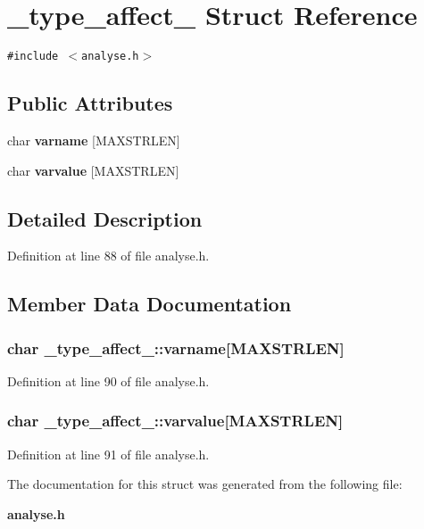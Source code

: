 \section{\_\-type\_\-affect\_\- Struct Reference}
\label{struct__type__affect__}
{\tt \#include $<$analyse.h$>$}

\subsection*{Public Attributes}
\begin{CompactItemize}
\item 
char {\bf varname} [MAXSTRLEN]
\item 
char {\bf varvalue} [MAXSTRLEN]
\end{CompactItemize}


\subsection{Detailed Description}


Definition at line 88 of file analyse.h.

\subsection{Member Data Documentation}
\subsubsection[{varname}]{\setlength{\rightskip}{0pt plus 5cm}char {\bf \_\-type\_\-affect\_\-::varname}[MAXSTRLEN]}\label{struct__type__affect___1edec9e19577f677c93b01add5342530}




Definition at line 90 of file analyse.h.
\subsubsection[{varvalue}]{\setlength{\rightskip}{0pt plus 5cm}char {\bf \_\-type\_\-affect\_\-::varvalue}[MAXSTRLEN]}\label{struct__type__affect___c29b2106e4535a40d6008dfefc4ccce3}




Definition at line 91 of file analyse.h.

The documentation for this struct was generated from the following file:\begin{CompactItemize}
\item 
{\bf analyse.h}\end{CompactItemize}

